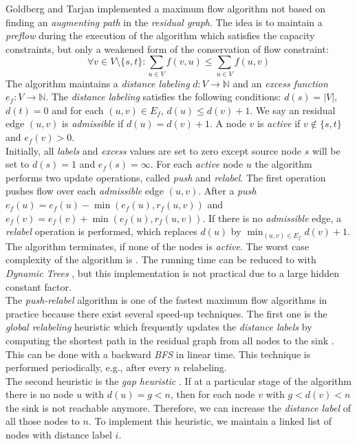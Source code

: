 Goldberg and Tarjan \cite{goldberg1988new} implemented a maximum flow algorithm
not based on finding an \emph{augmenting path} in the \emph{residual graph}. The idea is
to maintain a \emph{preflow} during the execution of the algorithm which satisfies the capacity 
constraints, but only a weakened form of the conservation of flow constraint:
\[\forall v \in V \setminus \{s,t\}: \sum_{u \in V} f(v,u) \le \sum_{u \in V} f(u,v)\]
The algorithm maintains a \emph{distance labeling} $d: V \rightarrow \mathbb{N}$ and an 
\emph{excess function} $e_f: V \rightarrow \mathbb{N}$. The \emph{distance labeling} satisfies
the following conditions: $d(s) = |V|$, $d(t) = 0$ and for each $(u,v) \in E_f$, $d(u) \le d(v) + 1$. We say an
residual edge $(u,v)$ is \emph{admissible} if $d(u) = d(v) + 1$. A node $v$ is \emph{active}
if $v \notin \{s,t\}$ and $e_f(v) > 0$.\\
Initially, all \emph{labels} and \emph{excess} values are set to zero except source node $s$ will be set to $d(s) = 1$
and $e_f(s) = \infty$. For each \emph{active} node $u$ the algorithm performs two update
operations, called \emph{push} and \emph{relabel}. The first operation pushes flow
over each \emph{admissible} edge $(u,v)$. After a \emph{push} $e_f(u) = e_f(u) - 
\min{(e_f(u),r_f(u,v))}$ and $e_f(v) = e_f(v) + \min{(e_f(u),r_f(u,v))}$. If there is no
\emph{admissible} edge, a \emph{relabel} operation is performed, which replaces $d(u)$ by
$\min_{(u,v) \in E_f} d(v) + 1$. The algorithm terminates, if none of the nodes is \emph{active}.
The worst case complexity of the algorithm is . The running time can be reduced
to  with \emph{Dynamic Trees} \cite{goldberg1988new, sleator1981data}, but this
implementation is not practical due to a large hidden constant factor.\\
The \emph{push-relabel} algorithm is one of the fastest maximum flow algorithms in practice
because there exist several speed-up techniques. The first one is
the \emph{global relabeling} heuristic which frequently updates the \emph{distance labels} by computing
the shortest path in the residual graph from all nodes to the sink \cite{cherkassky1997implementing}.
This can be done with a backward \emph{BFS} in linear time. This technique is performed periodically,
e.g., after every $n$ relabeling. \\
The second heuristic is the \emph{gap heuristic} \cite{cherkassky1994fast,derigs1989implementing}.
If at a particular stage of the algorithm there is no node $u$ with $d(u) = g < n$, then for each node
$v$ with $g < d(v) < n$ the sink is not reachable anymore. Therefore, we can increase the \emph{distance
label} of all those nodes to $n$. To implement this heuristic, we maintain a linked list of
nodes with distance label $i$.

